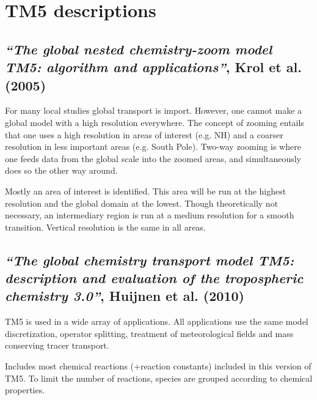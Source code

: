 \documentclass{article}
\begin{document}
\section{TM5 descriptions}

\subsection{\textit{“The global nested chemistry-zoom model TM5: algorithm and applications”}, Krol et al. (2005)}
For many local studies global transport is import. However, one cannot make a global model with a high resolution everywhere. The concept of zooming entails that one uses a high resolution in areas of interest (e.g. NH) and a coarser resolution in less important areas (e.g. South Pole). Two-way zooming is where one feeds data from the global scale into the zoomed areas, and simultaneously does so the other way around.

Mostly an area of interest is identified. This area will be run at the highest resolution and the global domain at the lowest. Though theoretically not necessary, an intermediary region is run at a medium resolution for a smooth transition. Vertical resolution is the same in all areas.

\subsection{\textit{“The global chemistry transport model TM5: description and evaluation of the tropospheric chemistry 3.0”}, Huijnen et al. (2010)}
TM5 is used in a wide array of applications. All applications use the same model discretization, operator splitting, treatment of meteorological fields and mass conserving tracer transport. 

Includes most chemical reactions (+reaction constants) included in this version of TM5. To limit the number of reactions, species are grouped according to chemical properties.
\end{document}

